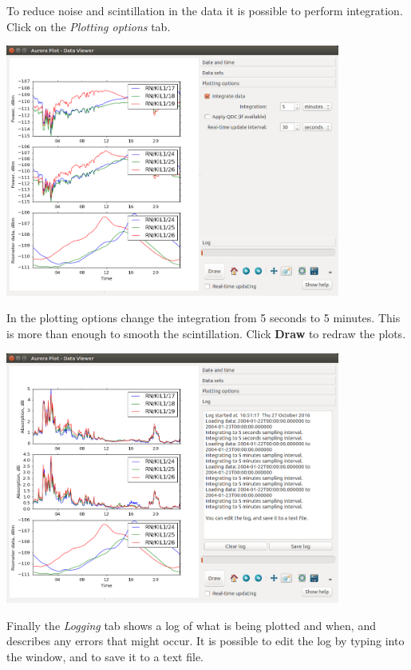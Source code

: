 \documentclass{article}
\begin{document}
To reduce noise and scintillation in the data it is possible to perform integration. Click on the {\it Plotting options} tab.

\begin{center}
\includegraphics[width=11cm]{images/dv-6.png}
\end{center}

\noindent In the plotting options change the integration from 5 seconds to 5 minutes. This is more than enough to smooth the scintillation. Click {\bf Draw} to redraw the plots.

\begin{center}
\includegraphics[width=11cm]{images/dv-7.png}
\end{center}

Finally the {\it Logging} tab shows a log of what is being plotted and when, and describes any errors that might occur. It is possible to edit the log by typing into the window, and to save it to a text file.
\end{document}
